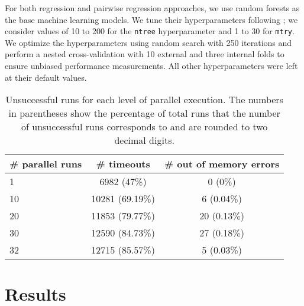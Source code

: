 For both regression and pairwise regression approaches, we use random forests as
the base machine learning models.
We tune their hyperparameters following
\cite{BISCHL201641}; we consider values of 10 to 200 for the \texttt{ntree}
hyperparameter and 1 to 30 for \texttt{mtry}. We optimize the hyperparameters
using random search with 250 iterations and perform a nested cross-validation
with 10 external and three internal folds to ensure unbiased performance
measurements. All other hyperparameters were left at their default values.

\begin{table*}[htb]
\centering
\begin{tabular}{l c c }
\toprule
\# parallel runs & \# timeouts & \# out of memory errors\\
\midrule
1 & 6982 (47\%) & 0 (0\%)\\
10 &  10281 (69.19\%) & 6 (0.04\%)\\
20 &  11853 (79.77\%) & 20 (0.13\%)\\
30 &  12590 (84.73\%) & 27 (0.18\%)\\
32 &  12715 (85.57\%) & 5 (0.03\%)\\
\bottomrule
\end{tabular}
\small \caption[Unsuccessful Runs for Each Level of Parallel Execution]{Unsuccessful runs for each level of parallel execution. The numbers in parentheses show the percentage of total runs that the number of unsuccessful runs corresponds to and are rounded to two decimal digits.}
\label{tab:errors}
\end{table*}

\section{Results}

